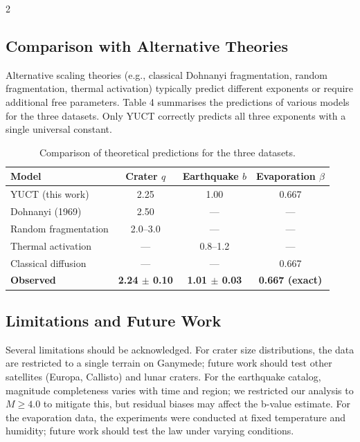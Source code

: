 \documentclass[11pt,a4paper]{article}
\begin{document}
\begin{multicols}{2}
		\subsection{Comparison with Alternative Theories}
		
		Alternative scaling theories (e.g., classical Dohnanyi fragmentation, random fragmentation, thermal activation) typically predict different exponents or require additional free parameters. Table 4 summarises the predictions of various models for the three datasets. Only YUCT correctly predicts all three exponents with a single universal constant.
		
		\begin{table}[htbp]
			\centering
			\caption{Comparison of theoretical predictions for the three datasets.}
			\label{tab:comparison}
			\begin{tabular}{lccc}
				\toprule
				\textbf{Model} & \textbf{Crater $q$} & \textbf{Earthquake $b$} & \textbf{Evaporation $\beta$} \\
				\midrule
				YUCT (this work) & 2.25 & 1.00 & 0.667 \\
				Dohnanyi (1969) & 2.50 & — & — \\
				Random fragmentation & 2.0–3.0 & — & — \\
				Thermal activation & — & 0.8–1.2 & — \\
				Classical diffusion & — & — & 0.667 \\
				\textbf{Observed} & \textbf{2.24 $\pm$ 0.10} & \textbf{1.01 $\pm$ 0.03} & \textbf{0.667 (exact)} \\
				\bottomrule
			\end{tabular}
		\end{table}
		
		\subsection{Limitations and Future Work}
		
		Several limitations should be acknowledged. For crater size distributions, the data are restricted to a single terrain on Ganymede; future work should test other satellites (Europa, Callisto) and lunar craters. For the earthquake catalog, magnitude completeness varies with time and region; we restricted our analysis to \(M \ge 4.0\) to mitigate this, but residual biases may affect the b-value estimate. For the evaporation data, the experiments were conducted at fixed temperature and humidity; future work should test the law under varying conditions.
		

\end{multicols}
\end{document}
